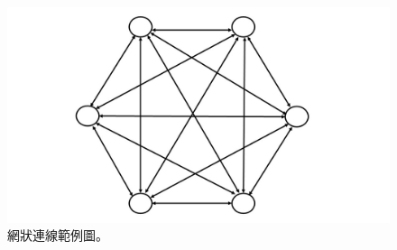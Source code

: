 \begin{figure}[H]
\centering
\includegraphics[scale=0.25]{images/6.jpg}
\caption{網狀連線範例圖。}
\label{i:byz-latency}
\end{figure}